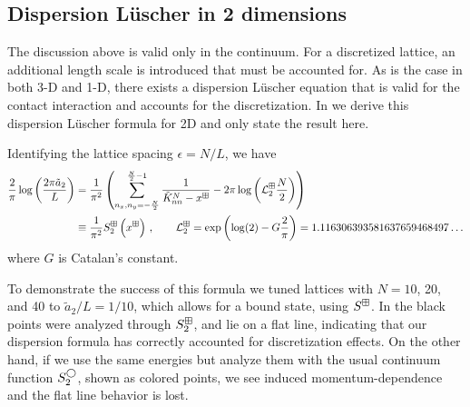 \subsection{Dispersion L\"uscher in 2 dimensions}

The discussion above is valid only in the continuum.
For a discretized lattice, an additional length scale is introduced that must be accounted for.
As is the case in both 3-D and 1-D, there exists a dispersion L\"uscher equation that is valid for the contact interaction and accounts for the discretization.
In  we derive this dispersion L\"uscher formula for 2D and only state the result here.

Identifying the lattice spacing $\epsilon=N/L$, we have
\begin{align}
    \frac{2}{\pi} \log \left(\frac{2\pi \tilde a_{2}}{L}\right)
    &=
    \frac{1}{\pi^2}
    \left(
        \sum_{n_x,n_y=-\frac{N}{2}}^{\frac{N}{2}-1}\frac{1}{\tilde{K}^N_{nn}-x^\boxplus}
        -2\pi \log \left(\mathcal{L}^\boxplus_2\frac{N}{2}\right)
    \right)
    \nonumber\\
    &\equiv\frac{1}{\pi^2}S^{\boxplus}_2\left(x^\boxplus\right)\, ,\label{eq:2d dispersion luscher}
	\qquad
    \mathcal{L}^\boxplus_{2}
    =
    \exp \left(\log (2)-G \frac{2}{\pi}\right)
    =
    1.116306393581637659468497 \ldots
\end{align}
where $G$ is Catalan's constant. %


To demonstrate the success of this formula we tuned lattices with $N=10$, 20, and 40 to $\tilde a_{2}/L = {1}/{10}$, which allows for a bound state, using $S^{\boxplus}$.
In  the black points were analyzed through $S^\boxplus_2$, and lie on a flat line, indicating that our dispersion \Luscher formula has correctly accounted for discretization effects.
On the other hand, if we use the same energies but analyze them with the usual continuum \Luscher function $S^{\bigcirc}_2$, shown as colored points, we see induced momentum-dependence and the flat line behavior is lost.

